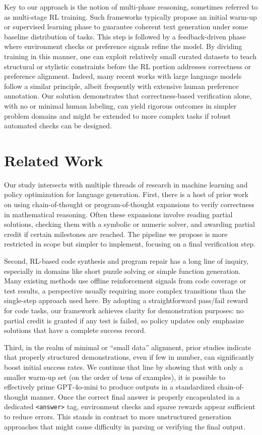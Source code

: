 \documentclass{article}
\begin{document}
Key to our approach is the notion of multi-phase reasoning, sometimes referred to as multi-stage RL training. Such frameworks typically propose an initial warm-up or supervised learning phase to guarantee coherent text generation under some baseline distribution of tasks. This step is followed by a feedback-driven phase where environment checks or preference signals refine the model. By dividing training in this manner, one can exploit relatively small curated datasets to teach structural or stylistic constraints before the RL portion addresses correctness or preference alignment. Indeed, many recent works with large language models follow a similar principle, albeit frequently with extensive human preference annotation. Our solution demonstrates that correctness-based verification alone, with no or minimal human labeling, can yield rigorous outcomes in simpler problem domains and might be extended to more complex tasks if robust automated checks can be designed.

\section{Related Work}
Our study intersects with multiple threads of research in machine learning and policy optimization for language generation. First, there is a host of prior work on using chain-of-thought or program-of-thought expansions to verify correctness in mathematical reasoning. Often these expansions involve reading partial solutions, checking them with a symbolic or numeric solver, and awarding partial credit if certain milestones are reached. The pipeline we propose is more restricted in scope but simpler to implement, focusing on a final verification step.

Second, RL-based code synthesis and program repair has a long line of inquiry, especially in domains like short puzzle solving or simple function generation. Many existing methods use offline reinforcement signals from code coverage or test results, a perspective usually requiring more complex transitions than the single-step approach used here. By adopting a straightforward pass/fail reward for code tasks, our framework achieves clarity for demonstration purposes: no partial credit is granted if any test is failed, so policy updates only emphasize solutions that have a complete success record.

Third, in the realm of minimal or “small data” alignment, prior studies indicate that properly structured demonstrations, even if few in number, can significantly boost initial success rates. We continue that line by showing that with only a smaller warm-up set (on the order of tens of examples), it is possible to effectively prime GPT-4o-mini to produce outputs in a standardized chain-of-thought manner. Once the correct final answer is properly encapsulated in a dedicated \texttt{<answer>} tag, environment checks and sparse rewards appear sufficient to reduce errors. This stands in contrast to more unstructured generation approaches that might cause difficulty in parsing or verifying the final output.
\end{document}
